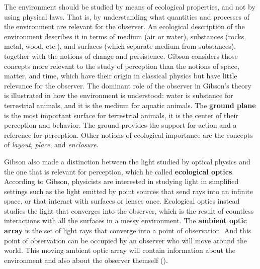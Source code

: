The environment should be studied by means of ecological properties, and not by using physical laws. That is, by understanding what quantities and processes of the environment are relevant for the observer. An ecological description of the environment describes it in terms of medium (air or water), substances (rocks, metal, wood, etc.), and surfaces (which separate medium from substances), together with the notions of change and persistence. 
Gibson considers those concepts more relevant to the study of perception than the notions of space, matter, and time, which have their origin in classical physics but have little relevance for the observer. The dominant role of the observer in Gibson's theory is illustrated in how the environment is understood: water is substance for terrestrial animals, and it is the medium for aquatic animals. 
The {\bf ground plane} 
is the most important surface for terrestrial animals, it is the center of their perception and behavior. The ground provides the support for action and a reference for perception. Other notions of ecological importance are the concepts of {\em layout}, {\em place}, and {\em enclosure}. 


Gibson also made a distinction between the light studied by optical physics and the one that is relevant for perception, which he called {\bf ecological optics}. 
According to Gibson, physicists are interested in studying light in simplified settings such as the light emitted by point sources that send rays into an infinite space, or that interact with surfaces or lenses once. Ecological optics instead studies the light that converges into the observer, which is the result of countless interactions with all the surfaces in a messy environment. The {\bf ambient optic array} is the set of light rays that converge into a point of observation. And this point of observation can be occupied by an observer who will move around the world. This moving ambient optic array will contain information about the environment and also about the observer themself (\fig{\ref{fig:gibson_bird}}). 


